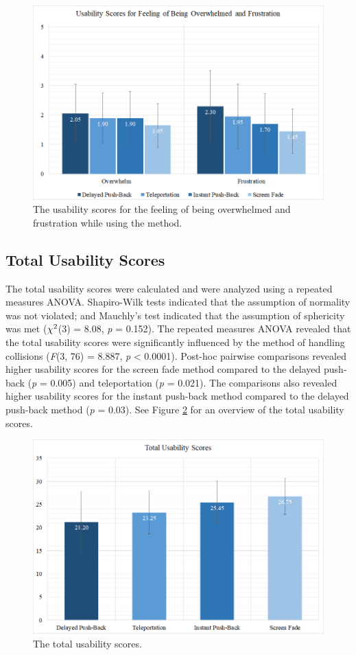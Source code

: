 \begin{figure}[th]
\centering
\includegraphics[width=1\textwidth]{img/overwhelm_frustration_scores.png}
\caption{The usability scores for the feeling of being overwhelmed and frustration while using the method.}
\label{fig:overwhelm_frustration_scores}
\end{figure}

\subsection{Total Usability Scores}

The total usability scores were calculated and were analyzed using a repeated measures ANOVA. Shapiro-Wilk tests indicated that the assumption of normality was not violated; and Mauchly's test indicated that the assumption of sphericity was met (\textit{$\chi\textsuperscript{2}$}(3) = 8.08, \textit{p} = 0.152). The repeated measures ANOVA revealed that the total usability scores were significantly influenced by the method of handling collisions (\textit{F}(3, 76) = 8.887, \textit{p} < 0.0001). Post-hoc pairwise comparisons revealed higher usability scores for the screen fade method compared to the delayed push-back (\textit{p} = 0.005) and teleportation (\textit{p} = 0.021). The comparisons also revealed higher usability scores for the instant push-back method compared to the delayed push-back method (\textit{p} = 0.03). See Figure \ref{fig:total_usability_scores} for an overview of the total usability scores.

\begin{figure}[th]
\centering
\includegraphics[width=1\textwidth]{img/total_usability_scores.png}
\caption{The total usability scores.}
\label{fig:total_usability_scores}
\end{figure}
